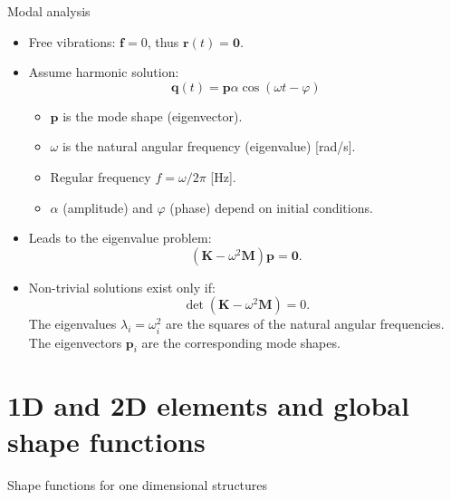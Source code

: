 \documentclass[aspectratio=169]{beamer}
\begin{document}
{{    \begin{frame}{Modal analysis}
      \vspace{-0.2cm}
      \begin{itemize}
        \item Free vibrations: $\mathbf f=0$, thus $\mathbf r(t)=\mathbf 0$.
        \item Assume harmonic solution: $$\mathbf q(t)=\mathbf p \alpha \cos (\omega t-\varphi)$$
              \vspace{-0.6cm}
              \begin{itemize}
                \item $\mathbf p$ is the mode shape (eigenvector).
                \item $\omega$ is the natural angular frequency (eigenvalue) [rad/s].
                \item Regular frequency $f=\omega/2\pi$ [Hz].
                \item $\alpha$ (amplitude) and $\varphi$ (phase) depend on initial conditions.
              \end{itemize}
        \item Leads to the eigenvalue problem:
              $$(\mathbf K-\omega^2\mathbf M)\mathbf p=\mathbf 0.$$
        \item Non-trivial solutions exist only if:
              $$\det(\mathbf K-\omega^2\mathbf M)=0.$$
              The eigenvalues $\lambda_i=\omega_i^2$ are the squares of the natural angular frequencies. \newline
              The eigenvectors $\mathbf p_i$ are the corresponding mode shapes.
      \end{itemize}
    \end{frame}
   }

  \section{1D and 2D elements and global shape functions}

  \begin{frame}{Shape functions for one dimensional structures}
    \begin{center}
\end{center}
\end{frame}}
\end{document}
